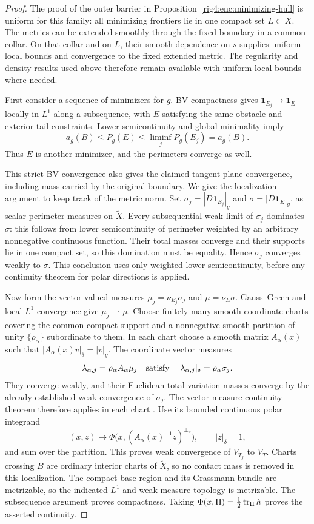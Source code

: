 \begin{proof}
The proof of the outer barrier in
Proposition~\ref{rig4:enc:minimizing-hull} is uniform for this family:
all minimizing frontiers lie in one compact set $L\subset X$.
The metrics can be extended smoothly through the fixed boundary in a
common collar. On that collar and on $L$, their smooth dependence on
$s$ supplies uniform local bounds and convergence to the fixed extended
metric. The regularity and density results used above therefore remain
available with uniform local bounds where needed.

First consider a sequence of minimizers for $g$. BV compactness gives
$\mathbf 1_{E_j}\to\mathbf 1_E$ locally in $L^1$ along a subsequence,
with $E$ satisfying the same obstacle and exterior-tail constraints.
Lower semicontinuity and global minimality imply
\[
 a_g(B)\le P_g(E)\le\liminf_jP_g(E_j)=a_g(B).
\]
Thus $E$ is another minimizer, and the perimeters converge as well.

This strict BV convergence also gives the claimed tangent-plane
convergence, including mass carried by the original boundary. We give
the localization argument to keep track of the metric norm. Set
$\sigma_j=|D\mathbf 1_{E_j}|_g$ and
$\sigma=|D\mathbf 1_E|_g$, as scalar perimeter measures on
$\widetilde X$. Every subsequential weak limit of $\sigma_j$ dominates
$\sigma$: this follows from lower semicontinuity of perimeter weighted
by an arbitrary nonnegative continuous function. Their total masses
converge and their supports lie in one compact set, so this domination
must be equality. Hence $\sigma_j$ converges weakly to $\sigma$.
This conclusion uses only weighted lower semicontinuity, before any
continuity theorem for polar directions is applied.

Now form the vector-valued measures
$\mu_j=\nu_{E_j}\sigma_j$ and $\mu=\nu_E\sigma$.
Gauss--Green and local $L^1$ convergence give $\mu_j\rightharpoonup\mu$.
Choose finitely many smooth coordinate charts covering the common
compact support and a nonnegative smooth partition of unity
$\{\rho_\alpha\}$ subordinate to them. In each chart choose a smooth
matrix $A_\alpha(x)$ such that
$|A_\alpha(x)v|_\delta=|v|_g$. The coordinate vector measures
\[
 \lambda_{\alpha,j}=\rho_\alpha A_\alpha\mu_j
 \quad\hbox{satisfy}\quad
 |\lambda_{\alpha,j}|_\delta=\rho_\alpha\sigma_j.
\]
They converge weakly, and their Euclidean total variation masses
converge by the already established weak convergence of $\sigma_j$.
The vector-measure continuity theorem therefore applies in each chart
\cite[Theorem~1.3]{Spector2011}. Use its bounded continuous polar
integrand
\[
 (x,z)\longmapsto
 \Phi\bigl(x,(A_\alpha(x)^{-1}z)^{\perp_g}\bigr),
 \qquad |z|_\delta=1,
\]
and sum over the partition. This proves weak convergence of $V_{T_j}$
to $V_T$. Charts crossing $B$ are ordinary interior charts of
$\widetilde X$, so no contact mass is removed in this localization.
The compact base region and its Grassmann bundle are metrizable, so
the indicated $L^1$ and weak-measure topology is metrizable.
The subsequence argument proves compactness. Taking
$\Phi(x,\Pi)=\tfrac12\operatorname{tr}_\Pi h$ proves the asserted continuity.


\end{proof}

